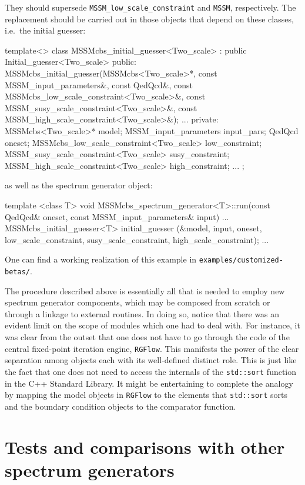 \documentclass[final,3p,11pt,pdflatex]{elsarticle}
\newcommand{\code}[1]{\lstinline|#1|}  %
\begin{document}
They should supersede
\code{MSSM_low_scale_constraint} and \code{MSSM}, respectively.
The replacement should be carried out in
those objects that depend on these classes,
i.e.\ the initial guesser:
\begin{numlstlisting}
template<>
class MSSMcbs_initial_guesser<Two_scale> : public Initial_guesser<Two_scale> {
public:
  MSSMcbs_initial_guesser(MSSMcbs<Two_scale>*,
                          const MSSM_input_parameters&,
                          const QedQcd&,
                          const MSSMcbs_low_scale_constraint<Two_scale>&,
                          const MSSM_susy_scale_constraint<Two_scale>&,
                          const MSSM_high_scale_constraint<Two_scale>&);
  ...
private:
  MSSMcbs<Two_scale>* model;
  MSSM_input_parameters input_pars;
  QedQcd oneset;
  MSSMcbs_low_scale_constraint<Two_scale> low_constraint;
  MSSM_susy_scale_constraint<Two_scale> susy_constraint;
  MSSM_high_scale_constraint<Two_scale> high_constraint;
  ...
};
\end{numlstlisting}
as well as the spectrum generator object:
\begin{numlstlisting}
template <class T>
void MSSMcbs_spectrum_generator<T>::run(const QedQcd& oneset,
					const MSSM_input_parameters& input)
{
  ...
  MSSMcbs_initial_guesser<T> initial_guesser
    (&model, input, oneset,
     low_scale_constraint, susy_scale_constraint, high_scale_constraint);
  ...
}
\end{numlstlisting}
One can find a working realization of this example
in \code{examples/customized-betas/}.

The procedure described above is essentially all that is needed
to employ new spectrum generator components,
which may be composed from scratch or through
a linkage to external routines.
In doing so,
notice that there was an evident limit on the scope of
modules which one had to deal with.
For instance, it was clear from the outset
that one does not have to go through the code of the central
fixed-point iteration engine, \code{RGFlow}.
This manifests the power of the clear separation among objects
each with its well-defined distinct role.
This is just like the fact that one does not need to access the internals
of the \code{std::sort} function in the C++ Standard Library.
It might be entertaining to complete the analogy by
mapping the model objects in \code{RGFlow}
to the elements that \code{std::sort} sorts
and the boundary condition objects
to the comparator function.


\section{Tests and comparisons with other spectrum generators}
\label{sec:comparison}
\end{document}
